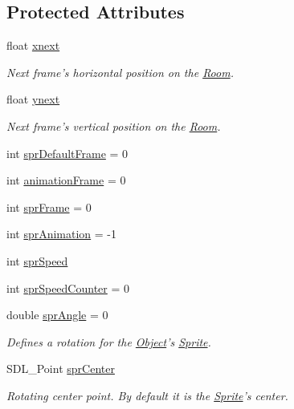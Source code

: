 \subsection*{Protected Attributes}
\begin{DoxyCompactItemize}
\item 
float \hyperlink{class_object_adf988f967e46c4fd5d3276778d83b51c}{xnext}
\begin{DoxyCompactList}\small\item\em Next frame's horizontal position on the \hyperlink{class_room}{Room}. \end{DoxyCompactList}\item 
float \hyperlink{class_object_a23acb9460963396dc0bda8d9dc0c6771}{ynext}
\begin{DoxyCompactList}\small\item\em Next frame's vertical position on the \hyperlink{class_room}{Room}. \end{DoxyCompactList}\item 
int \hyperlink{class_object_afc05c8f84fe3feb003332413f1e5ef75}{spr\-Default\-Frame} = 0
\item 
int \hyperlink{class_object_a671da7bcaade0763ea158d70137017a0}{animation\-Frame} = 0
\item 
int \hyperlink{class_object_ad61c7c0c72c28dd4abbc5f14cfdf3f18}{spr\-Frame} = 0
\item 
int \hyperlink{class_object_a72bd9c2d466c47f6cd8df5e38185d432}{spr\-Animation} = -\/1
\item 
int \hyperlink{class_object_ab66e9611429a7f5a0f0889332514e607}{spr\-Speed}
\item 
int \hyperlink{class_object_aa16902b53e4e950380464c71f0b9554b}{spr\-Speed\-Counter} = 0
\item 
double \hyperlink{class_object_a5e5f645424be8ec1ce1cf9dd858e939a}{spr\-Angle} = 0
\begin{DoxyCompactList}\small\item\em Defines a rotation for the \hyperlink{class_object}{Object}'s \hyperlink{class_sprite}{Sprite}. \end{DoxyCompactList}\item 
S\-D\-L\-\_\-\-Point \hyperlink{class_object_ab5d3b1e8dbb35e139a3fd3a3b28b8610}{spr\-Center}
\begin{DoxyCompactList}\small\item\em Rotating center point. By default it is the \hyperlink{class_sprite}{Sprite}'s center. \end{DoxyCompactList}\item 

\end{DoxyCompactItemize}
